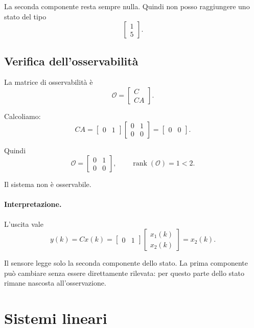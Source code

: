 La seconda componente resta sempre nulla.  
Quindi non posso raggiungere uno stato del tipo
\[
\begin{bmatrix}
1\\5
\end{bmatrix}.
\]

\subsection{Verifica dell'osservabilità}

La matrice di osservabilità è
\[
\mathcal{O}=
\begin{bmatrix}
C\\
CA
\end{bmatrix}.
\]

Calcoliamo:
\[
CA=
\begin{bmatrix}
0 & 1
\end{bmatrix}
\begin{bmatrix}
0 & 1\\
0 & 0
\end{bmatrix}
=
\begin{bmatrix}
0 & 0
\end{bmatrix}.
\]

Quindi
\[
\mathcal{O}=
\begin{bmatrix}
0 & 1\\
0 & 0
\end{bmatrix},
\qquad
\operatorname{rank}(\mathcal{O})=1<2.
\]

Il sistema non è osservabile.

\paragraph{Interpretazione.}
L'uscita vale
\[
y(k)=Cx(k)=
\begin{bmatrix}
0 & 1
\end{bmatrix}
\begin{bmatrix}
x_1(k)\\
x_2(k)
\end{bmatrix}
=x_2(k).
\]

Il sensore legge solo la seconda componente dello stato.  
La prima componente può cambiare senza essere direttamente rilevata: per questo parte dello stato rimane nascosta all'osservazione.

\section{Sistemi lineari}

